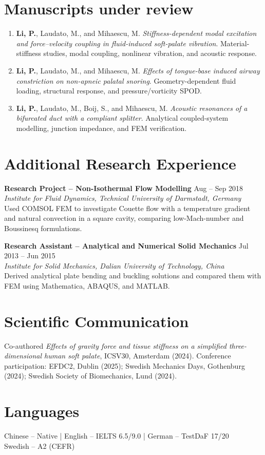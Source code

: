 \documentclass[a4paper,10pt]{article}
\begin{document}
\section{Manuscripts under review}
\begin{enumerate}
\item \textbf{Li, P.}, Laudato, M., and Mihaescu, M.
\textit{Stiffness-dependent modal excitation and force--velocity coupling in fluid-induced soft-palate vibration}.
Material-stiffness studies, modal coupling, nonlinear vibration, and acoustic response.
\item \textbf{Li, P.}, Laudato, M., and Mihaescu, M.
\textit{Effects of tongue-base induced airway constriction on non-apneic palatal snoring}.
Geometry-dependent fluid loading, structural response, and pressure/vorticity SPOD.
\item \textbf{Li, P.}, Laudato, M., Boij, S., and Mihaescu, M.
\textit{Acoustic resonances of a bifurcated duct with a compliant splitter}.
Analytical coupled-system modelling, junction impedance, and FEM verification.
\end{enumerate}

\section{Additional Research Experience}
\textbf{Research Project -- Non-Isothermal Flow Modelling} \hfill Aug -- Sep 2018\\
\textit{Institute for Fluid Dynamics, Technical University of Darmstadt, Germany}\\
Used COMSOL FEM to investigate Couette flow with a temperature gradient and natural
convection in a square cavity, comparing low-Mach-number and Boussinesq formulations.

\vspace{4pt}
\textbf{Research Assistant -- Analytical and Numerical Solid Mechanics} \hfill Jul 2013 -- Jun 2015\\
\textit{Institute for Solid Mechanics, Dalian University of Technology, China}\\
Derived analytical plate bending and buckling solutions and compared them with FEM
using Mathematica, ABAQUS, and MATLAB.

\section{Scientific Communication}
Co-authored \textit{Effects of gravity force and tissue stiffness on a simplified
three-dimensional human soft palate}, ICSV30, Amsterdam (2024).
Conference participation: EFDC2, Dublin (2025); Swedish Mechanics Days, Gothenburg (2024);
Swedish Society of Biomechanics, Lund (2024).

\section{Languages}
Chinese -- Native \quad | \quad English -- IELTS 6.5/9.0 \quad | \quad
German -- TestDaF 17/20\\
Swedish -- A2 (CEFR)
\end{document}
